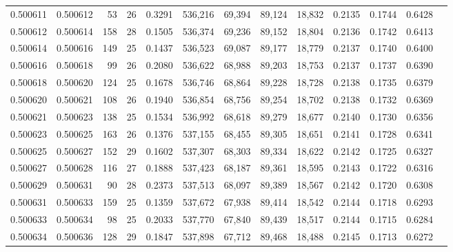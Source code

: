 \begin{tabular}{rrrrrrrrrrrrr}
0.500611 & 0.500612 &  53 &  26 &                                     0.3291 & 536,216 &  69,394 &  89,124 &  18,832 & 0.2135 & 0.1744 & 0.6428 \\
0.500612 & 0.500614 & 158 &  28 &                                     0.1505 & 536,374 &  69,236 &  89,152 &  18,804 & 0.2136 & 0.1742 & 0.6413 \\
0.500614 & 0.500616 & 149 &  25 &                                     0.1437 & 536,523 &  69,087 &  89,177 &  18,779 & 0.2137 & 0.1740 & 0.6400 \\
0.500616 & 0.500618 &  99 &  26 &                                     0.2080 & 536,622 &  68,988 &  89,203 &  18,753 & 0.2137 & 0.1737 & 0.6390 \\
0.500618 & 0.500620 & 124 &  25 &                                     0.1678 & 536,746 &  68,864 &  89,228 &  18,728 & 0.2138 & 0.1735 & 0.6379 \\
0.500620 & 0.500621 & 108 &  26 &                                     0.1940 & 536,854 &  68,756 &  89,254 &  18,702 & 0.2138 & 0.1732 & 0.6369 \\
0.500621 & 0.500623 & 138 &  25 &                                     0.1534 & 536,992 &  68,618 &  89,279 &  18,677 & 0.2140 & 0.1730 & 0.6356 \\
0.500623 & 0.500625 & 163 &  26 &                                     0.1376 & 537,155 &  68,455 &  89,305 &  18,651 & 0.2141 & 0.1728 & 0.6341 \\
0.500625 & 0.500627 & 152 &  29 &                                     0.1602 & 537,307 &  68,303 &  89,334 &  18,622 & 0.2142 & 0.1725 & 0.6327 \\
0.500627 & 0.500628 & 116 &  27 &                                     0.1888 & 537,423 &  68,187 &  89,361 &  18,595 & 0.2143 & 0.1722 & 0.6316 \\
0.500629 & 0.500631 &  90 &  28 &                                     0.2373 & 537,513 &  68,097 &  89,389 &  18,567 & 0.2142 & 0.1720 & 0.6308 \\
0.500631 & 0.500633 & 159 &  25 &                                     0.1359 & 537,672 &  67,938 &  89,414 &  18,542 & 0.2144 & 0.1718 & 0.6293 \\
0.500633 & 0.500634 &  98 &  25 &                                     0.2033 & 537,770 &  67,840 &  89,439 &  18,517 & 0.2144 & 0.1715 & 0.6284 \\
0.500634 & 0.500636 & 128 &  29 &                                     0.1847 & 537,898 &  67,712 &  89,468 &  18,488 & 0.2145 & 0.1713 & 0.6272 \\

\end{tabular}
